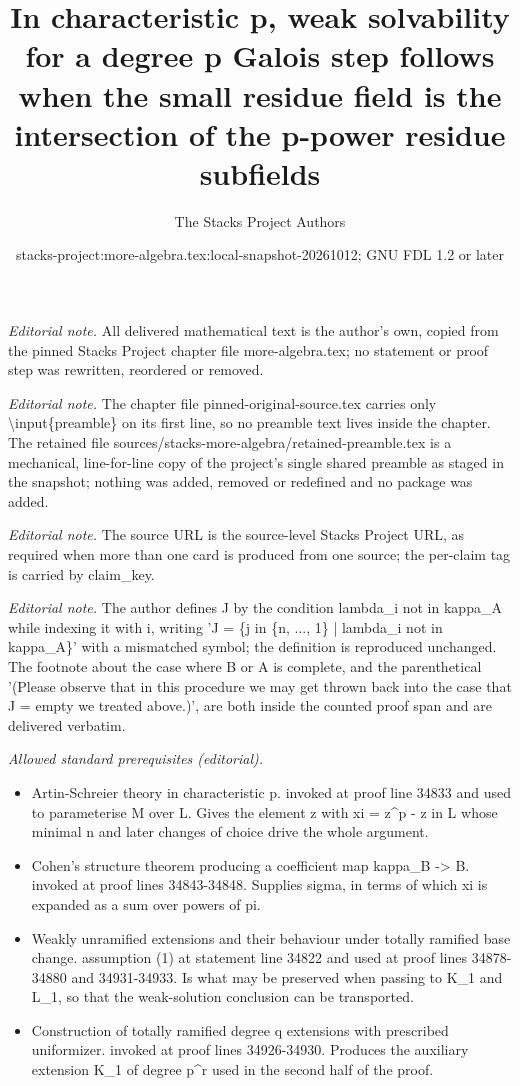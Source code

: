 \documentclass[10pt,a4paper]{amsart}
\title{In characteristic p, weak solvability for a degree p Galois step follows when the small residue field is the intersection of the p-power residue subfields}
\author{The Stacks Project Authors}
\date{stacks-project:more-algebra.tex:local-snapshot-20261012; GNU FDL 1.2 or later}
\theoremstyle{plain}
\theoremstyle{definition}
\theoremstyle{remark}
\numberwithin{equation}{subsection}
\begin{document}
\maketitle
\setcounter{subsection}{1}
\noindent\textit{Editorial note.} All delivered mathematical text is the author's own, copied from the pinned Stacks Project chapter file more-algebra.tex; no statement or proof step was rewritten, reordered or removed.\par\medskip
\noindent\textit{Editorial note.} The chapter file pinned-original-source.tex carries only \textbackslash{}input\{preamble\} on its first line, so no preamble text lives inside the chapter. The retained file sources/stacks-more-algebra/retained-preamble.tex is a mechanical, line-for-line copy of the project's single shared preamble as staged in the snapshot; nothing was added, removed or redefined and no package was added.\par\medskip
\noindent\textit{Editorial note.} The source URL is the source-level Stacks Project URL, as required when more than one card is produced from one source; the per-claim tag is carried by claim\_key.\par\medskip
\noindent\textit{Editorial note.} The author defines J by the condition lambda\_i not in kappa\_A while indexing it with i, writing 'J = \{j in \{n, ..., 1\} | lambda\_i not in kappa\_A\}' with a mismatched symbol; the definition is reproduced unchanged. The footnote about the case where B or A is complete, and the parenthetical '(Please observe that in this procedure we may get thrown back into the case that J = empty we treated above.)', are both inside the counted proof span and are delivered verbatim.\par\medskip
\noindent\textit{Allowed standard prerequisites (editorial).}\begin{itemize}
\item Artin-Schreier theory in characteristic p. invoked at proof line 34833 and used to parameterise M over L. Gives the element z with xi = z\textasciicircum{}p - z in L whose minimal n and later changes of choice drive the whole argument.
\item Cohen's structure theorem producing a coefficient map kappa\_B -> B. invoked at proof lines 34843-34848. Supplies sigma, in terms of which xi is expanded as a sum over powers of pi.
\item Weakly unramified extensions and their behaviour under totally ramified base change. assumption (1) at statement line 34822 and used at proof lines 34878-34880 and 34931-34933. Is what may be preserved when passing to K\_1 and L\_1, so that the weak-solution conclusion can be transported.
\item Construction of totally ramified degree q extensions with prescribed uniformizer. invoked at proof lines 34926-34930. Produces the auxiliary extension K\_1 of degree p\textasciicircum{}r used in the second half of the proof.
\end{itemize}\medskip
\end{document}
